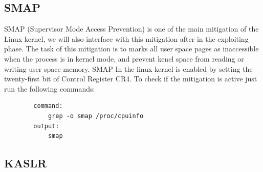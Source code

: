     \subsection{SMAP}
    SMAP (Supervisor Mode Access Prevention) is one of the main mitigation of the Linux kernel, we will also interface with this mitigation after in the exploiting phase.\newline
    The task of this mitigation is to marks all user space pages as inaccessible when the process is in kernel mode, and prevent kenel space from reading or writing user space memory.\newline
    SMAP In the linux kernel is enabled by setting the twenty-first bit of Control Register CR4.\newline
    To check if the mitigation is active just run the following commands: \newline
      \begin{verbatim}
        command:
            grep -o smap /proc/cpuinfo
        output: 
            smap
    \end{verbatim}
    \subsection{KASLR}

